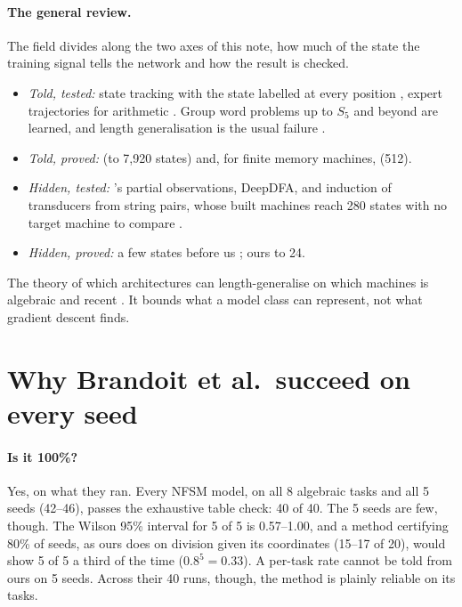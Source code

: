 \documentclass[11pt]{article}
\begin{document}
\paragraph{The general review.} The field divides along the two axes of this note, how much of the
state the training signal tells the network and how the result is checked.
\begin{itemize}
\item \emph{Told, tested:} state tracking with the state labelled at every position
  \citep{liu-2022-transformers-shortcuts-automata,merrill-2024-illusion-of-state-ssm,grazzi-2024-state-tracking-linear-rnn-negative-eigenvalues},
  expert trajectories for arithmetic
  \citep{papazov-2025-exact-learning-arithmetic-differentiable-agents}. Group word problems up to
  $S_5$ and beyond are learned, and length generalisation is the usual failure
  \citep{howe-2026-automaton-underneath-householder-linear-rnn}.
\item \emph{Told, proved:} \citet{brandoit-2026-length-independent-state-tracking} (to 7{,}920
  states) and, for finite memory machines,
  \citet{giles-1995-learning-class-large-finite-state-machines} (512).
\item \emph{Hidden, tested:} \citet{liu-2022-transformers-shortcuts-automata}'s partial
  observations, DeepDFA, and induction of transducers from string pairs, whose built machines reach
  280 states with no target machine to compare
  \citep{ginn-2026-neural-induction-finite-state-transducers}.
\item \emph{Hidden, proved:} a few states before us
  \citep{zeng-1993-self-clustering-recurrent-networks,aichernig-2024-learning-minimal-automata-rnn};
  ours to 24.
\end{itemize}
The theory of which architectures can length-generalise on which machines is algebraic and recent
\citep{zetzsche-2026-length-generalization-transformers-compression}. It bounds what a model class
can represent, not what gradient descent finds.

\section{Why Brandoit et al.\ succeed on every seed}
\label{sec:nfsm}

\paragraph{Is it 100\%?} Yes, on what they ran. Every NFSM model, on all 8 algebraic tasks and all
5 seeds (42--46), passes the exhaustive table check: 40 of 40. The 5 seeds are few, though. The
Wilson 95\% interval for 5 of 5 is 0.57--1.00, and a method certifying 80\% of seeds, as ours does
on division given its coordinates (15--17 of 20), would show 5 of 5 a third of the time
($0.8^5 = 0.33$). A per-task rate cannot be told from ours on 5 seeds. Across their 40 runs, though,
the method is plainly reliable on its tasks.
\end{document}
